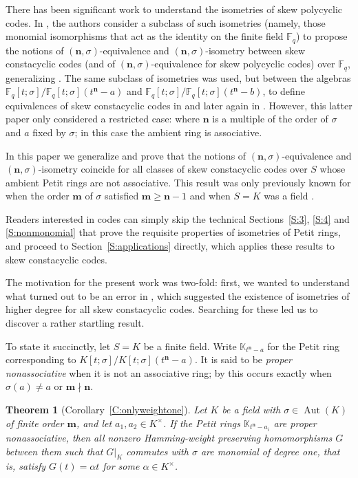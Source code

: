 \documentclass[11pt]{amsart}
\theoremstyle{plain}
\newtheorem*{maintheorem}{Theorem}
\theoremstyle{definition}
\numberwithin{equation}{section}
\numberwithin{figure}{section}
\newcommand{\ring}{S}
\newcommand{\field}{K}
\newcommand{\Kone}[1]{K[t;\sigma]/K[t;\sigma](t^{\de}-#1)}
\newcommand{\Konenew}[1]{\mathbb{K}_{t^\de-#1}}
\newcommand{\Fqone}[1]{\F_q[t;\sigma]/\F_q[t;\sigma](t^{\de}-#1)}
\newcommand{\os}{\mathbf{m}}  %
\newcommand{\de}{\mathbf{n}}  %
\newcommand{\F}{\mathbb{F}}
\DeclareMathOperator{\Aut}{Aut}
\begin{document}
 There has been significant work to understand the isometries of skew polycyclic codes. In \cite{OuazzouHorlemannAydin2025, OuazzouNajmeddineAydin2025}, the authors consider a subclass of such isometries (namely, those monomial isomorphisms that act as the identity on the finite field $\mathbb{F}_q$) to propose the notions of $(\de,\sigma)$-equivalence and $(\de,\sigma)$-isometry between skew constacyclic codes (and of $(\de,\sigma)$-equivalence for skew polycyclic codes) over $\mathbb{F}_q$, generalizing \cite{ChenDinhLiu2014}.
The same subclass of isometries was used, but between the algebras  $\Fqone{a}$ and $\Fqone{b}$, to define equivalences of skew constacyclic codes
in \cite{BoulanouarBatoulBoucher2021}
and later again in  \cite{LobilloMunoz2025}.  However, this latter paper only considered a restricted case: where $\de$ is a multiple of the order of $\sigma$
and $a$ fixed by $\sigma$; in this case the ambient ring is associative.



In this paper we generalize and prove that the notions of $(\de,\sigma)$-equivalence and $(\de,\sigma)$-isometry coincide for all classes of skew constacyclic codes over $S$ whose ambient Petit rings are not associative. %
This result was only previously known for when the order $\os$ of $\sigma$  satisfied $\os\geq \de-1$ and when $\ring=K$ was a field \cite{BrownPumpluen2018}.

 Readers interested in codes can simply skip the technical Sections~\ref{S:3}, \ref{S:4} and \ref{S:nonmonomial} that prove the requisite properties of  isometries of Petit rings, and proceed to Section~\ref{S:applications} directly, which applies these  results to skew constacyclic codes.


The motivation for the present work was
two-fold: first, we wanted  to understand what turned out to be an error in
\cite[Theorem 4]{OuazzouNajmeddineAydin2025},  which suggested the existence of isometries of higher degree for all skew constacyclic codes.  Searching for these led us to discover a rather startling result.

To state it succinctly, let $S=K$ be a finite field.  Write $\Konenew{a}$ for the Petit ring  corresponding to $\Kone{a}$.  It is said to be  \emph{proper nonassociative} when it is not an associative ring; by \cite[(15)]{Petit1967} this occurs exactly when $\sigma(a)\neq a$ or $\os\nmid \de$.

\begin{maintheorem}[Corollary~\ref{C:onlyweightone}]
Let $\field$ be a field with $\sigma\in \Aut(\field)$ of finite order $\os$, and let $a_1,a_2\in \field^\times$.  If the Petit rings $\Konenew{a_i}$
are proper nonassociative, then all nonzero Hamming-weight preserving homomorphisms $G$ between them such that $G|_{\field}$ commutes with $\sigma$ are monomial of degree one, that is, satisfy $G(t)=\alpha t$ for some $\alpha \in \field^\times$.
\end{maintheorem}
\end{document}
